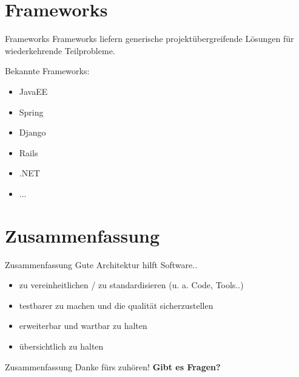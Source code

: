\documentclass{beamer}
\begin{document}
\section{Frameworks}

\begin{frame}{Frameworks}
	Frameworks liefern generische projektübergreifende Lösungen für wiederkehrende Teilprobleme.

	\vspace{0.5em}

	Bekannte Frameworks:

	\begin{itemize}
		\item JavaEE
		\item Spring
		\item Django
		\item Rails
		\item .NET
		\item ...
	\end{itemize}
\end{frame}


\section{Zusammenfassung}

\begin{frame}{Zusammenfassung}
	Gute Architektur hilft Software..
	\begin{itemize}
		\item zu vereinheitlichen / zu standardisieren (u. a. Code, Tools..)
		\item testbarer zu machen und die qualität sicherzustellen
		\item erweiterbar und wartbar zu halten
		\item übersichtlich zu halten
	\end{itemize}
\end{frame}

\begin{frame}{Zusammenfassung}
	Danke fürs zuhören! \textbf{Gibt es Fragen?}
\end{frame}
\end{document}
